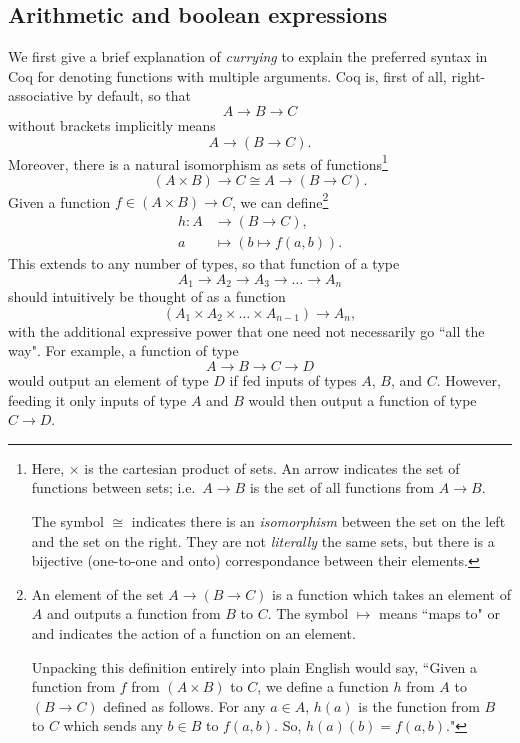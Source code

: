 \documentclass[12pt,notitlepage]{report}
\theoremstyle{plain}
\theoremstyle{definition}
\newcommand{\define}[1]{\emph{#1}\index{#1}}
\numberwithin{equation}{section}
\begin{document}
\subsection{Arithmetic and boolean expressions}
We first give a brief explanation of \define{currying} to explain the preferred syntax in Coq for denoting functions with multiple arguments.  Coq is, first of all, right-associative by default, so that
\[
    A \to B \to C
\]
without brackets implicitly means
\[
    A \to (B \to C).
\]
Moreover, there is a natural isomorphism as sets of functions\footnote{Here, $\times$ is the cartesian product of sets.  An arrow indicates the set of functions between sets; i.e.\ $A\to B$ is the set of all functions from $A \to B$. \par The symbol $\cong$ indicates there is an \emph{isomorphism} between the set on the left and the set on the right.  They are not \emph{literally} the same sets, but there is a bijective (one-to-one and onto) correspondance between their elements.}
\[
    (A \times B) \to C \cong A \to (B \to C).
\]
Given a function $f \in (A \times B) \to C$, we can define\footnote{An element of the set $A\to (B \to C)$ is a function which takes an element of $A$ and outputs a function from $B$ to $C$.  The symbol $\mapsto$ means ``maps to" or and indicates the action of a function on an element. \par Unpacking this definition entirely into plain English would say, ``Given a function from $f$ from $(A\times B)$ to $C$, we define a function $h$ from $A$ to $(B\to C)$ defined as follows.  For any $a \in A$, $h(a)$ is the function from $B$ to $C$ which sends any $b\in B$ to $f(a,b)$.  So, $h(a)(b)=f(a,b)$."}
\begin{align*}
    h: A &\to (B \to C), \\
        a &\mapsto (b \mapsto f(a,b)).
\end{align*}
This extends to any number of types, so that function of a type
\[
    A_1 \to A_2 \to A_3 \to \ldots \to A_n
\]
should intuitively be thought of as a function
\[
    (A_1 \times A_2 \times \ldots \times A_{n-1}) \to A_n,
\]
with the additional expressive power that one need not necessarily go ``all the way".  For example, a function of type
\[
    A \to B \to C \to D
\]
would output an element of type $D$ if fed inputs of types $A$, $B$, and $C$.  However, feeding it only inputs of type $A$ and $B$ would then output a function of type $C \to D$.
\end{document}
